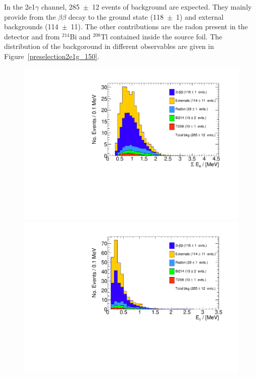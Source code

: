 \documentclass[main.tex]{subfiles}
\begin{document}
\NI In the 2e1$\gamma$ channel, 285~$\pm$~12 events of background are expected. They mainly provide from the $\beta\beta$ decay to the ground state (118~$\pm$~1) and external backgrounds (114~$\pm$~11). The other contributions are the radon present in the detector and from $^{\text{214}}$Bi and $^{\text{208}}$Tl contained inside the source foil. The distribution of the backgoround in different observables are given in Figure~\ref{preselection2e1g_150}.


\begin{figure}[h!]
\centering
\includegraphics[scale=0.35]{pictures/FinalResults/bb2nu2/150/preselection/preSelection2e1gBKG_tot_e_energy.pdf}
\includegraphics[scale=0.35]{pictures/FinalResults/bb2nu2/150/preselection/preSelection2e1gBKG_gmc_energy.pdf}

\end{figure}
\end{document}
